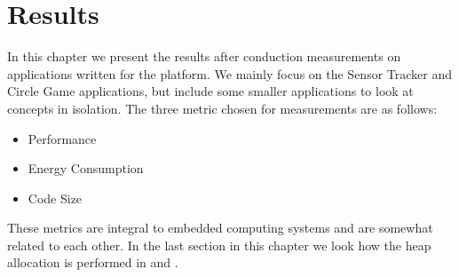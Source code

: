 
\chapter{Results}
\label{chap:results}

In this chapter we present the results after conduction measurements on applications written for the {\rg} platform.
We mainly focus on the Sensor Tracker and Circle Game applications, but include some smaller applications to look at concepts in isolation.
The three metric chosen for measurements are as follows:
\begin{itemize}
  \item Performance
  \item Energy Consumption
  \item Code Size
\end{itemize}
These metrics are integral to embedded computing systems and are somewhat related to each other.
In the last section in this chapter we look how the heap allocation is performed in {\rust} and {\C}.





